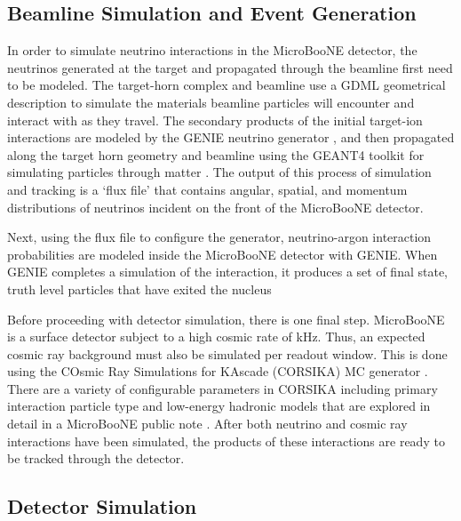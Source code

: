 \subsection{Beamline Simulation and Event Generation}
In order to simulate neutrino interactions in the MicroBooNE detector, the neutrinos generated at the target and propagated through the beamline first need to be modeled. The target-horn complex and beamline use a GDML geometrical description \cite{bib:gdml} to simulate the materials beamline particles will encounter and interact with as they travel.  The secondary products of the initial target-ion interactions are modeled by the GENIE neutrino generator \cite{bib:genie}, and then propagated along the target horn geometry and beamline using the GEANT4 toolkit for simulating particles through matter \cite{bib:geant4}. The output of this process of simulation and tracking is a `flux file' that contains angular, spatial, and momentum distributions of neutrinos incident on the front of the MicroBooNE detector.  
\par Next, using the flux file to configure the generator, neutrino-argon interaction probabilities are modeled inside the MicroBooNE detector with GENIE.  When GENIE completes a simulation of the interaction, it produces a set of final state, truth level particles that have exited the nucleus  
\par Before proceeding with detector simulation, there is one final step.  MicroBooNE is a surface detector subject to a high cosmic rate of kHz.  Thus, an expected cosmic ray background must also be simulated per readout window. This is done using the COsmic Ray Simulations for KAscade (CORSIKA) MC generator \cite{bib:corsika}. There are a variety of configurable parameters in CORSIKA including primary interaction particle type and low-energy hadronic models that are explored in detail in a MicroBooNE public note \cite{bib:pubnote_cosmic}.  After both neutrino and cosmic ray interactions have been simulated, the products of these interactions are ready to be tracked through the detector.


\subsection{Detector Simulation}

